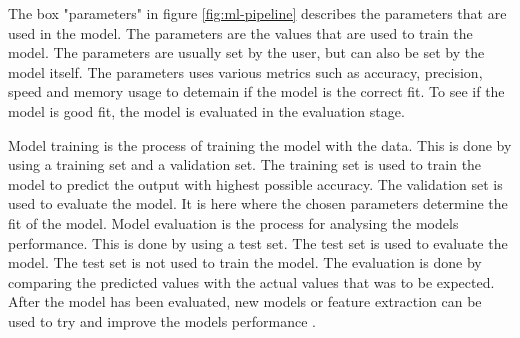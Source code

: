 The box "parameters" in figure \ref{fig:ml-pipeline} describes the parameters that are used in the model. The parameters are the values that are used to train the model. The parameters are usually set by the user, but can also be set by the model itself. The parameters uses various metrics such as accuracy, precision, speed and memory usage to detemain if the model is the correct fit. To see if the model is good fit, the model is evaluated in the evaluation stage.

Model training is the process of training the model with the data. This is done by using a training set and a validation set. The training set is used to train the model to predict the output with highest possible accuracy. The validation set is used to evaluate the model. It is here where the chosen parameters determine the fit of the model.
Model evaluation is the process for analysing the models performance. This is done by using a test set. The test set is used to evaluate the model. The test set is not used to train the model. The evaluation is done by comparing the predicted values with the actual values that was to be expected. After the model has been evaluated, new models or feature extraction can be used to try and improve the models performance \cite{ml-pipeline-javapoint}.

